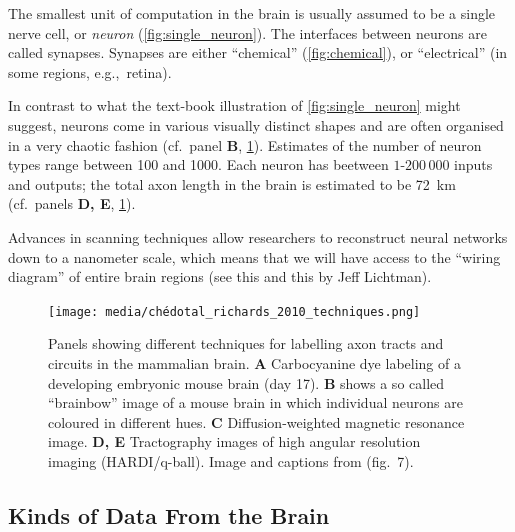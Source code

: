 \documentclass[10pt,letterpaper,oneside]{article}
\begin{document}
The smallest unit of computation in the brain is usually assumed to be a single nerve cell, or \emph{neuron} (\cref{fig:single_neuron}). The interfaces between neurons are called synapses. Synapses are either \enquote{chemical} (\cref{fig:chemical}), or \enquote{electrical} (in some regions, e.g.,~retina).

In contrast to what the text-book illustration of \cref{fig:single_neuron} might suggest, neurons come in various visually distinct shapes and are often organised in a very chaotic fashion (cf.~panel \textbf{B}, \cref{fig:neuron_techniques}). Estimates of the number of neuron types range between 100 and 1000. Each neuron has beetween $1$-$200\,000$ inputs and outputs; the total axon length in the brain is estimated to be \SI{72}{\kilo\meter} (cf.~panels \textbf{D, E}, \cref{fig:neuron_techniques}).

Advances in scanning techniques allow researchers to reconstruct neural networks down to a nanometer scale, which means that we will have access to the \enquote{wiring diagram} of entire brain regions (see this  and this  by Jeff Lichtman).


\begin{figure}
	\centering
	\texttt{[image: media/chédotal\_richards\_2010\_techniques.png]}
	\caption{Panels showing different techniques for labelling axon tracts and circuits in the mammalian brain. \textbf{A} Carbocyanine dye labeling of a developing embryonic mouse brain (day 17). \textbf{B} shows a so called \enquote{brainbow} image of a mouse brain in which individual neurons are coloured in different hues. \textbf{C} Diffusion-weighted magnetic resonance image. \textbf{D, E} Tractography images of high angular resolution imaging (HARDI/q-ball).  Image and captions from \cite{chedotal2010wiring} (fig.~7).}
	\label{fig:neuron_techniques}
\end{figure}

\newpage

\subsection{Kinds of Data From the Brain}
\end{document}
